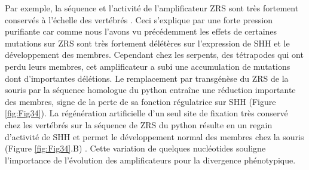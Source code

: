 Par exemple, la séquence et l’activité de l’\gls{amplificateur} \acrshort{ZRS} sont très fortement conservés à l’échelle des vertébrés \citep{kvon_progressive_2016}. Ceci s’explique par une forte pression purifiante car comme nous l’avons vu précédemment les effets de certaines mutations sur \acrshort{ZRS} sont très fortement délétères sur l’expression de \acrshort{SHH} et le développement des membres. Cependant chez les serpents, des tétrapodes qui ont perdu leurs membres, cet \gls{amplificateur} a subi une accumulation de mutations dont d’importantes délétions. Le remplacement par transgénèse du \acrshort{ZRS} de la souris par la séquence homologue du python entraîne une réduction importante des membres, signe de la perte de sa fonction régulatrice sur \acrshort{SHH} (Figure \ref{fig:Fig34}). La régénération artificielle d’un seul site de fixation très conservé chez les vertébrés sur la séquence de \acrshort{ZRS} du python résulte en un regain d’activité de \acrshort{SHH} et permet le développement normal des membres chez la souris (Figure \ref{fig:Fig34}.B) \citep{lettice_opposing_2012}. Cette variation de quelques nucléotides souligne l’importance de l’évolution des \glspl{amplificateur} pour la divergence phénotypique. 

